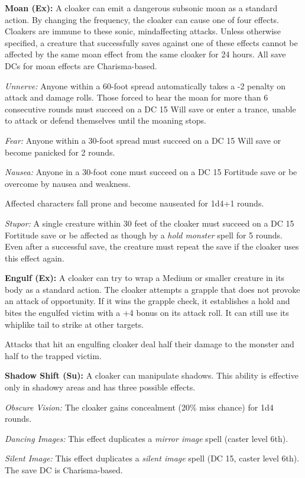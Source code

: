 \documentclass{article}
\begin{document}
\textbf{Moan (Ex): }A cloaker can emit a dangerous subsonic moan as a standard 
action. By changing the frequency, the cloaker can cause one of four effects. Cloakers 
are immune to these sonic, mindaffecting attacks. Unless otherwise specified, a 
creature that successfully saves against one of these effects cannot be affected 
by the same moan effect from the same cloaker for 24 hours. All save DCs for moan 
effects are Charisma-based.

\textit{Unnerve: }Anyone within a 60-foot spread automatically takes a -2 penalty 
on attack and damage rolls. Those forced to hear the moan for more than 6 consecutive 
rounds must succeed on a DC 15 Will save or enter a trance, unable to attack or 
defend themselves until the moaning stops.

\textit{Fear: }Anyone within a 30-foot spread must succeed on a DC 15 Will save 
or become panicked for 2 rounds.

\textit{Nausea: }Anyone in a 30-foot cone must succeed on a DC 15 Fortitude save 
or be overcome by nausea and weakness.

Affected characters fall prone and become nauseated for 1d4+1 rounds.

\textit{Stupor: }A single creature within 30 feet of the cloaker must succeed on 
a DC 15 Fortitude save or be affected as though by a \textit{hold monster }spell 
for 5 rounds. Even after a successful save, the creature must repeat the save if 
the cloaker uses this effect again.

\textbf{Engulf (Ex): }A cloaker can try to wrap a Medium or smaller creature in 
its body as a standard action. The cloaker attempts a grapple that does not provoke 
an attack of opportunity. If it wins the grapple check, it establishes a hold and 
bites the engulfed victim with a +4 bonus on its attack roll. It can still use 
its whiplike tail to strike at other targets.

Attacks that hit an engulfing cloaker deal half their damage to the monster and 
half to the trapped victim.

\textbf{Shadow Shift (Su): }A cloaker can manipulate shadows. This ability is effective 
only in shadowy areas and has three possible effects.

\textit{Obscure Vision: }The cloaker gains concealment (20\% miss chance) for 1d4 
rounds.

\textit{Dancing Images: }This effect duplicates a \textit{mirror image }spell (caster 
level 6th).

\textit{Silent Image: }This effect duplicates a \textit{silent image }spell (DC 
15, caster level 6th). The save DC is Charisma-based.
\end{document}
